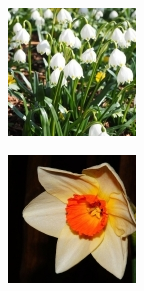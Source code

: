 \documentclass{report}
\begin{document}
\begin{figure}[h!]
\begin{subfigure}[t]{0.19\textwidth}
    \label{fig:dataset-sub2}
  \end{subfigure}
  \hfill
  \begin{subfigure}[t]{0.19\textwidth}
    \centering
    \includegraphics[width=\textwidth]{dataset/flower_2.jpg}
    \label{fig:dataset-sub3}
  \end{subfigure}
  \hfill
  \begin{subfigure}[t]{0.19\textwidth}
    \centering
    \includegraphics[width=\textwidth]{dataset/flower_3.jpg}

\end{subfigure}
\end{figure}
\end{document}
